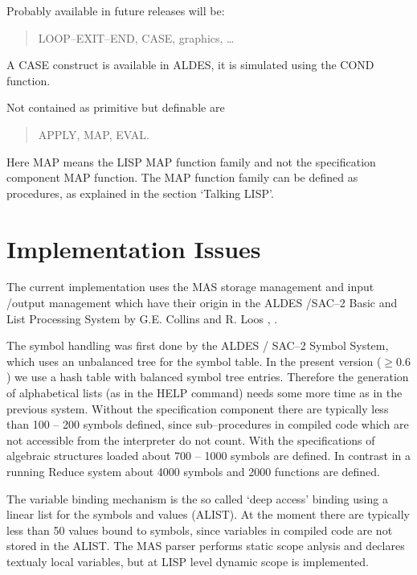 Probably available in future releases will be:
\begin{quote}
LOOP--EXIT--END, 
CASE, graphics, \ldots 
\end{quote}
A CASE construct is available in ALDES, it is simulated using 
the COND function.

Not contained as primitive but definable are 
\begin{quote}
APPLY, MAP, EVAL.  
\end{quote}
Here MAP means the LISP MAP function family and not the 
specification component MAP function. 
The MAP function family can be defined as 
procedures, as explained in the section `Talking LISP'.


\section{Implementation Issues}

The current implementation uses the 
MAS storage management and
input /output management which have 
their origin in the
ALDES /SAC--2 Basic and List Processing System by 
G.E. Collins and R. Loos \cite{Collins 82}, \cite{Loos 76}. 

The symbol handling was first done by the 
ALDES / SAC--2 Symbol System,
which uses an unbalanced tree for the symbol table.
In the present version ($\geq 0.6$) we use 
a hash table with balanced symbol tree entries.
Therefore the generation of alphabetical lists 
(as in the HELP command) needs some more time as 
in the previous system.
Without the specification component
there are typically less than 100 -- 200 symbols defined,
since sub--procedures in compiled code 
which are not accessible from the interpreter do not count.
With the specifications of algebraic structures loaded 
about 700 -- 1000 symbols are defined.
In contrast in a running Reduce system about 4000 symbols and
2000 functions are defined.

The variable binding mechanism is the so called `deep access' binding
using a linear list  for the symbols and values 
(ALIST).  
At the moment there are typically less than 50 values bound to symbols,
since variables in compiled code are not stored in the ALIST.
The MAS parser performs static scope anlysis and declares 
textualy local variables, but at LISP level 
dynamic scope is implemented.


